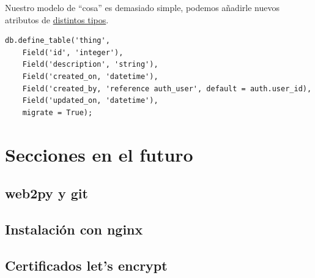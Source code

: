 \documentclass[
  12pt,
  spanish,
]{article}
\begin{document}
Nuestro modelo de ``cosa'' es demasiado simple, podemos añadirle nuevos
atributos de
\href{http://web2py.com/books/default/chapter/29/06/the-database-abstraction-layer\#Field-types}{distintos
tipos}.

\begin{verbatim}
db.define_table('thing',
    Field('id', 'integer'),
    Field('description', 'string'),
    Field('created_on, 'datetime'),
    Field('created_by, 'reference auth_user', default = auth.user_id),
    Field('updated_on, 'datetime'),
    migrate = True);
\end{verbatim}

\hypertarget{secciones-en-el-futuro}{%
\section{Secciones en el futuro}\label{secciones-en-el-futuro}}

\hypertarget{web2py-y-git}{%
\subsection{web2py y git}\label{web2py-y-git}}

\hypertarget{instalaciuxf3n-con-nginx}{%
\subsection{Instalación con nginx}\label{instalaciuxf3n-con-nginx}}

\hypertarget{certificados-lets-encrypt}{%
\subsection{Certificados let's
encrypt}\label{certificados-lets-encrypt}}
\end{document}
